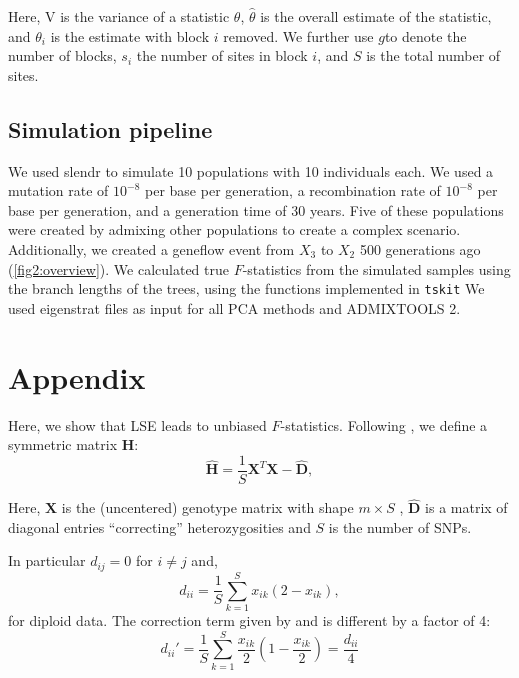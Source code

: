 \documentclass[12pt, letterpaper]{article}
\newcommand{\MX}{\mathbf{X}}
\begin{document}
Here, V is the variance of a statistic $\theta$, $\hat{\theta}$ is the overall estimate of the statistic, and $\theta_i$ is the estimate with block $i$ removed. We further use $g$to denote the number of blocks, $s_i$ the number of sites in block $i$, and $S$ is the total number of sites.

\subsection{Simulation pipeline}

We used slendr \cite{petr_slendr_2022} to simulate 10 populations with 10 individuals each. We used a mutation rate of $10^{-8}$ per base per generation, a recombination rate of $10^{-8}$ per base per generation, and a generation time of 30 years. Five of these populations were created by admixing other populations to create a complex scenario. Additionally, we created a geneflow event from $X_3$ to $X_2$ 500 generations ago (\ref{fig2:overview}). We calculated true $F$-statistics from the simulated samples using the branch lengths of the trees, using the functions implemented in \texttt{tskit} \citep{baumdicker} We used eigenstrat files as input for all PCA methods and ADMIXTOOLS 2. 


\section{Appendix}

Here, we show that LSE \cite{cabreros_likelihood-free_2019} leads to unbiased $F$-statistics. Following \cite{cabreros_likelihood-free_2019}, we define a symmetric matrix $\hat{\mathbf{H}}$:
\begin{equation}
    \hat{\mathbf{H}} = \frac{1}{S}\mathbf{X}^T\mathbf{X} - \hat{\mathbf{D}},
\end{equation}

Here, $\MX$ is the (uncentered) genotype matrix with shape $m \times S$ , $\hat{\mathbf{D}}$ is a matrix of diagonal entries ``correcting'' heterozygosities and $S$ is the number of SNPs.

In particular $d_{ij} = 0 $ for $i \neq j$ and, 
\begin{equation}
    d_{ii} = \frac{1}{S}\sum_{k=1}^S x_{ik}(2-x_{ik}),
\end{equation}
for diploid data. The correction term given by \cite{reich_reconstructing_2009} and \cite{patterson_ancient_2012} is different by a factor of 4:
\begin{equation*}
    d_{ii}' = \frac{1}{S}\sum_{k=1}^S \frac{x_{ik}}{2}(1-\frac{x_{ik}}{2}) = \frac{d_{ii}}{4}
\end{equation*}
\end{document}
